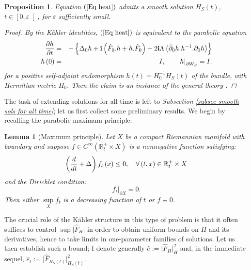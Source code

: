\documentclass{article}
\newtheorem{lemma}[theorem]{Lemma}
\newtheorem{proposition}[theorem]{Proposition}
\begin{document}
\begin{proposition}     \label{Prop - short time existence}
Equation $\left( \ref{Eq heat}\right) $
admits a smooth solution $H_{S}\left( t\right) $, $t\in \left[ 0,\varepsilon
\right[ $, for $\varepsilon $ sufficiently small.
\begin{proof}
By the K\"{a}hler identities, $\left( \ref{Eq heat}\right) $ is
equivalent to the parabolic equation%
\begin{eqnarray*}       \index{evolution equation!is nonlinear parabolic}%
        \frac{\partial h}{\partial t} 
        &=&-\left\{ \Delta _{0}h+\mathbf{i}\left( \hat{F}_{0}.h
        +h.\hat{F}_{0}\right) +2\mathbf{i}\Lambda 
        \left( \bar{\partial}_{0}h.h^{-1}.\partial _{0}h\right) \right\}\\
        h\left( 0\right)  &=&I,\qquad \left. h\right\vert _{\partial W_{S}}=I.
\end{eqnarray*}%
for a positive self-adjoint endomorphism $h\left( t\right)
=H_{0}^{-1}H_{S}\left( t\right) $ of the bundle, with Hermitian metric $H_{0}$. Then the claim is an instance of the general theory  \cite[Part IV, \S 11, p.122]{Hamilton}.
\end{proof}
\end{proposition}

The task of extending solutions for all time is left to  \emph{Subsection \ref{subsec smooth sols for all time}}; let us first collect some preliminary results. We begin by
recalling the parabolic maximum principle:
\begin{lemma}[Maximum principle]        
\label{Lemma max principle mfds w bdry}
Let $X$ be a compact Riemannian
manifold with boundary and suppose $f\in C^{\infty }\left( \mathbb{R}%
_{t}^{+}\times X\right) $ is a nonnegative function satisfying:%
\begin{equation*}       \index{maximum principle}%
        \left(\frac{d}{dt}+\Delta \right) f_{t}\left( x\right) \leq 0,
        \quad \forall \left(t,x\right) \in \mathbb{R}_{t}^{+}\times X
\end{equation*}
and the Dirichlet condition:%
\begin{equation*}
        \left. f_{t}\right\vert _{\partial X}=0.%
\end{equation*}%
Then either $\sup\limits_{X}f_{t}$ is a decreasing function of $t$ or $%
f\equiv 0$.
\end{lemma}

The crucial role of the K\"{a}hler
structure in this type of problem is that it often suffices to control $\sup
\vert \hat{F}_{H}\vert $ in order to obtain uniform bounds on $H$
and its derivatives, hence to take limits in one-parameter
families of solutions. Let us then establish such a bound; I denote generally $\hat{e}:= \vert \hat{F}_{H}\vert _{H}^{2}$ 
and, in the immediate sequel, $\hat{e}_{t}:= \vert \hat{F}%
_{H_{S}\left( t\right) }\vert _{H_{S}\left( t\right) }^{2}$.
\end{document}
